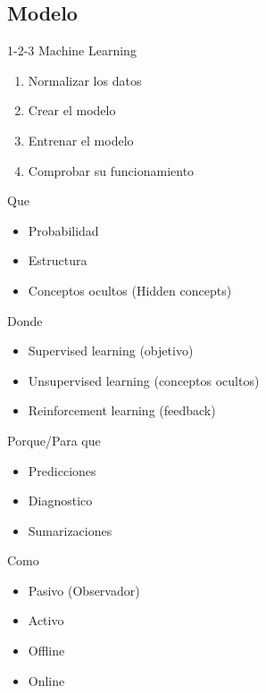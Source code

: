 \documentclass{beamer}
\begin{document}
\subsection{Modelo}
\begin{frame}{1-2-3 Machine Learning}
    \begin{enumerate}
        \item Normalizar los datos
        \item Crear el modelo
        \item Entrenar el modelo
        \item Comprobar su funcionamiento
    \end{enumerate}
\end{frame}

\begin{frame}{Que}
    \begin{itemize}
        \item Probabilidad
        \item Estructura
        \item Conceptos ocultos (Hidden concepts)
    \end{itemize}
\end{frame}

\begin{frame}{Donde}
    \begin{itemize}
        \item Supervised learning (objetivo)
        \item Unsupervised learning (conceptos ocultos)
        \item Reinforcement learning (feedback)
    \end{itemize}
\end{frame}

\begin{frame}{Porque/Para que}
    \begin{itemize}
        \item Predicciones
        \item Diagnostico
        \item Sumarizaciones
    \end{itemize}
\end{frame}

\begin{frame}{Como}
    \begin{itemize}
        \item Pasivo (Observador)
        \item Activo
        \item Offline
        \item Online
    \end{itemize}
\end{frame}
\end{document}
